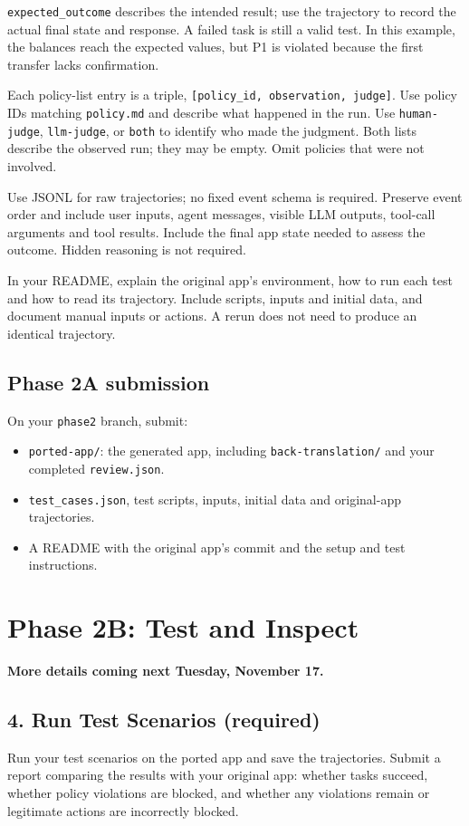 \documentclass[10pt,a4paper]{article}
\begin{document}
\texttt{expected\_outcome} describes the intended result; use the trajectory
to record the actual final state and response. A failed task is still a valid
test. In this example, the balances reach the expected values, but P1 is violated
because the first transfer lacks confirmation.

Each policy-list entry is a triple, \texttt{[policy\_id, observation, judge]}.
Use policy IDs matching \texttt{policy.md} and describe what happened in the run.
Use
\texttt{human-judge}, \texttt{llm-judge}, or \texttt{both} to identify who made
the judgment. Both lists describe the observed run; they may be empty. Omit
policies that were not involved.

Use JSONL for raw trajectories; no fixed event schema is required. Preserve event
order and include user inputs, agent messages, visible LLM outputs, tool-call
arguments and tool results. Include the final app state needed to assess the
outcome. Hidden reasoning is not required.

In your README, explain the original app's environment, how to run each test and
how to read its trajectory. Include scripts, inputs and initial data, and document
manual inputs or actions. A rerun does not need to produce an identical trajectory.

\subsection*{Phase 2A submission}
On your \texttt{phase2} branch, submit:
\begin{itemize}
\item \texttt{ported-app/}: the generated app, including
\texttt{back-translation/} and your completed \texttt{review.json}.
\item \texttt{test\_cases.json}, test scripts, inputs, initial data and original-app trajectories.
\item A README with the original app's commit and the setup and test instructions.
\end{itemize}

\clearpage
\section*{Phase 2B: Test and Inspect}

\textbf{More details coming next Tuesday, November 17.}

\subsection*{4. Run Test Scenarios (required)}
Run your test scenarios on the ported app and save the trajectories. Submit a
report comparing the results with your original app: whether tasks succeed,
whether policy violations are blocked, and whether any violations remain or
legitimate actions are incorrectly blocked.
\end{document}
